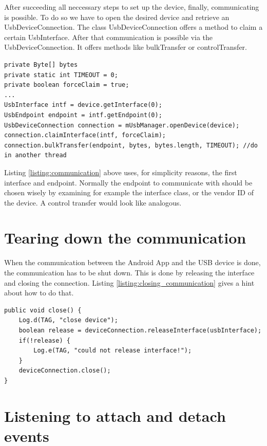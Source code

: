 After succeeding all neccessary steps to set up the device, finally, communicating is possible. To do so we have to open the desired device and retrieve an UsbDeviceConnection. The class UsbDeviceConnection offers a method to claim a certain UsbInterface. After that communication is possible via the UsbDeviceConnection. It offers methods like bulkTransfer or controlTransfer.

\begin{lstlisting}[caption=Communicating with a connected device \cite{android_usb_host}, label=listing:communication]
private Byte[] bytes
private static int TIMEOUT = 0;
private boolean forceClaim = true;
...
UsbInterface intf = device.getInterface(0);
UsbEndpoint endpoint = intf.getEndpoint(0);
UsbDeviceConnection connection = mUsbManager.openDevice(device); 
connection.claimInterface(intf, forceClaim);
connection.bulkTransfer(endpoint, bytes, bytes.length, TIMEOUT); //do in another thread
\end{lstlisting}

Listing \ref{listing:communication} above uses, for simplicity reasons, the first interface and endpoint. Normally the endpoint to communicate with should be chosen wisely by examining for example the interface class, or the vendor ID of the device. A control transfer would look like analogous.

\section{Tearing down the communication}

When the communication between the Android App and the USB device is done, the communication has to be shut down. This is done by releasing the interface and closing the connection. Listing \ref{listing:closing_communication} gives a hint about how to do that.

\begin{lstlisting}[caption=Closing communication, label=listing:closing_communication]
public void close() {
	Log.d(TAG, "close device");
	boolean release = deviceConnection.releaseInterface(usbInterface);
	if(!release) {
		Log.e(TAG, "could not release interface!");
	}
	deviceConnection.close();
}
\end{lstlisting}

\section{Listening to attach and detach events}

